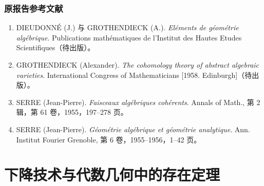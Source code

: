 \section*{原报告参考文献}
\begin{enumerate}
\item[{[1]}]\label{fga2-bib-1} DIEUDONNÉ (J.) 与 GROTHENDIECK (A.). \emph{Eléments de géométrie algébrique}. Publications mathématiques de l'Institut des Hautes Etudes Scientifiques（待出版）。
\item[{[2]}]\label{fga2-bib-2} GROTHENDIECK (Alexander). \emph{The cohomology theory of abstract algebraic varieties}. International Congress of Mathematicians [1958. Edinburgh]（待出版）。
\item[{[3]}]\label{fga2-bib-3} SERRE (Jean-Pierre). \emph{Faisceaux algébriques cohérents}. Annals of Math., 第 2 辑，第 61 卷，1955，197--278 页。
\item[{[4]}]\label{fga2-bib-4} SERRE (Jean-Pierre). \emph{Géométrie algébrique et géométrie analytique}. Ann. Institut Fourier Grenoble, 第 6 卷，1955--1956，1--42 页。
\end{enumerate}


\clearpage
\renewcommand\fgaAnchorPrefix{fga3}
\part{下降技术与代数几何中的存在定理}
\setcounter{part}{0}
\renewcommand\thepart{3.\Roman{part}}
\setcounter{chapter}{0}
\renewcommand\thechapter{\Alph{chapter}}
\renewcommand\thesubsection{\thesection.\alph{subsection}}
\renewcommand\fgaAnchorPrefix{fga3.i}

